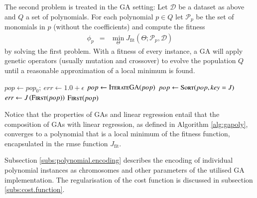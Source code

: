 \documentclass[preprint,authoryear,12pt]{elsarticle}
\begin{document}
The second problem is treated in the \ac{GA} setting: Let $\mathcal{D}$ be a dataset as above and $Q$ a set of polynomials. For each polynomial $p\in Q$ let $\mathcal{P}_p$ be the set of monomials in $p$ (without the coefficients) and compute the fitness
%
\begin{eqnarray*}
\phi_p &=& \min_\Theta J_{\textrm{fit}}\left(\Theta;\mathcal{P}_p,\mathcal{D}\right)
\end{eqnarray*}
%
by solving the first problem. With a fitness of every instance, a \ac{GA} will apply genetic operators (usually mutation and crossover) to evolve the population $Q$ until a reasonable approximation of a local minimum is found. 
%
\begin{algorithm}[tb]
\begin{algorithmic}
	\State $pop \gets pop_0;\: err \gets 1.0+\epsilon$
		\State $pop \gets \Call{IterateGA}{pop}$
		\State $pop \gets \Call{Sort}{pop, key = J}$
		\State $err \gets J\left(\Call{First}{pop}\right)$
	\EndWhile
	\State\Return $\Call{First}{pop}$
\EndFunction
\end{algorithmic}
\caption{\ac{GAPoly} uses linear regression to find monomial coefficients that minimize the \ac{rmse} over a dataset and \acp{GA} to explore the space of polynomials. The role of the linear regression step is to produce a fitting error that sorts the population. At exit the \ac{rmse} of the fittest instance is bounded by $\epsilon$ or the maximum number of allowed iterations.}\label{alg:gapoly}
\end{algorithm} 
%
Notice that the properties of \acp{GA} and linear regression entail that
the composition of \acp{GA} with linear regression, as defined in Algorithm \ref{alg:gapoly}, converges to a polynomial that is a local minimum of the fitness function, encapsulated in the \ac{rmse} function $J_{\textrm{fit}}$.
%

%
Subsection \ref{subs:polynomial.encoding} describes the encoding of individual polynomial instances as chromosomes and other parameters of the utilised \ac{GA} implementation. The regularisation of the cost function is discussed in subsection \ref{subs:cost.function}.

%
\end{document}
